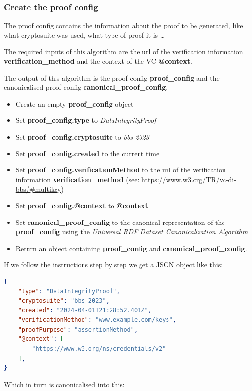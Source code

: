 \documentclass[
	a4paper               %
	,bibliography=totoc   %
	,listof=totoc         %
	,monolingual
	twoside=false,
]{bfhthesis}              %
\begin{document}
\subsubsection{Create the proof config}
\label{subsubsec:proof_config}
The proof config contains the information about the proof to be generated, like what cryptosuite was used, what type of proof it is \dots

The required inputs of this algorithm are the url of the verification information \textbf{verification\_method} and the context of the VC \textbf{@context}.

The output of this algorithm is the proof config \textbf{proof\_config} and the canonicalised proof config \textbf{canonical\_proof\_config}.

\begin{itemize}
	\item Create an empty \textbf{proof\_config} object
	\item Set \textbf{proof\_config.type} to \textit{DataIntegrityProof}
	\item Set \textbf{proof\_config.cryptosuite} to \textit{bbs-2023}
	\item Set \textbf{proof\_config.created} to the current time
	\item Set \textbf{proof\_config.verificationMethod} to the url of the verification information \textbf{verification\_method} (see: \url{https://www.w3.org/TR/vc-di-bbs/#multikey})
	\item Set \textbf{proof\_config.@context} to \textbf{@context}
	\item Set \textbf{canonical\_proof\_config} to the canonical representation of the \textbf{proof\_config} using the \textit{Universal RDF Dataset Canonicalization Algorithm}\cite{rdf}
	\item Return an object containing \textbf{proof\_config} and \textbf{canonical\_proof\_config}.
\end{itemize}

If we follow the instructions step by step we get a JSON object like this:
\begin{lstlisting}[language=json,firstnumber=1,caption={Example Proof Config},captionpos=b]
{
	"type": "DataIntegrityProof",
	"cryptosuite": "bbs-2023",
	"created": "2024-04-01T21:28:52.401Z",
	"verificationMethod": "www.example.com/keys",
	"proofPurpose": "assertionMethod",
	"@context": [
		"https://www.w3.org/ns/credentials/v2"
	],
}
\end{lstlisting}

Which in turn is canonicalised into this:
\end{document}
